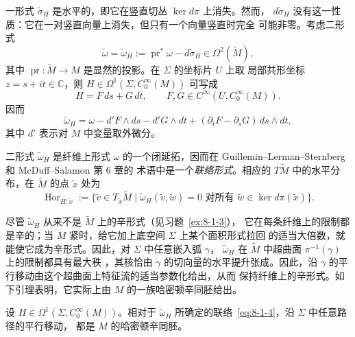 一形式 $\widetilde\sigma_H$ 是水平的，即它在竖直切丛 $\ker d\pi$ 上消失。然而，
$d\widetilde\sigma_H$ 没有这一性质：它在一对竖直向量上消失，但只有一个向量竖直时完全
可能非零。考虑二形式
\begin{equation}\label{eq:8-1-2}
  \widetilde\omega=\widetilde\omega_H
  :=\operatorname{pr}^*\omega-d\widetilde\sigma_H
  \in\Omega^2(\widetilde M),
\end{equation}
其中 $\operatorname{pr}:\widetilde M\to M$ 是显然的投影。在 $\Sigma$ 的坐标片 $U$ 上取
局部共形坐标 $z=s+it\in\mathbb C$，则
$H\in\Omega^1(\Sigma,C_0^\infty(M))$ 可写成
\[
  H=F\,ds+G\,dt,
  \qquad F,G\in C^\infty(U,C_0^\infty(M)).
\]
因而
\begin{equation}\label{eq:8-1-3}
  \widetilde\omega_H
  =\omega-d'F\wedge ds-d'G\wedge dt
   +(\partial_tF-\partial_sG)\,ds\wedge dt,
\end{equation}
其中 $d'$ 表示对 $M$ 中变量取外微分。

二形式 $\widetilde\omega_H$ 是纤维上形式 $\omega$ 的一个闭延拓，因而在
Guillemin--Lerman--Sternberg  和 McDuff--Salamon  第 6 章的
术语中是一个\emph{联络形式}。相应的 $T\widetilde M$ 中的水平分布，在
$\widetilde M$ 的点 $\widetilde x$ 处为
\begin{equation}\label{eq:8-1-4}
  \operatorname{Hor}_{H;\widetilde x}
  :=\bigl\{\widetilde v\in T_{\widetilde x}\widetilde M
  \mid \widetilde\omega_H(\widetilde v,\widetilde w)=0
  \text{ 对所有 }\widetilde w\in\ker d\pi(\widetilde x)\bigr\}.
\end{equation}

尽管 $\widetilde\omega_H$ 从来不是 $\widetilde M$ 上的辛形式（见习题~\ref{ex:8-1-3}），
它在每条纤维上的限制都是辛的；当 $M$ 紧时，给它加上底空间 $\Sigma$ 上某个面积形式拉回
的适当大倍数，就能使它成为辛形式。因此，对 $\Sigma$ 中任意嵌入弧 $\gamma$，
$\widetilde\omega_H$ 在 $\widetilde M$ 中超曲面 $\pi^{-1}(\gamma)$ 上的限制都具有最大秩
，其核恰由
$\gamma$ 的切向量的水平提升张成。因此，沿 $\gamma$ 的平行移动由这个超曲面上特征流的适当参数化给出，从而
保持纤维上的辛形式。如下引理表明，它实际上由 $M$ 的一族哈密顿辛同胚给出。

\begin{lemma}\label{lem:8-1-1}
设 $H\in\Omega^1(\Sigma,C_0^\infty(M))$。相对于
$\widetilde\omega_H$ 所确定的联络~\eqref{eq:8-1-4}，沿 $\Sigma$ 中任意路径的平行移动，
都是 $M$ 的哈密顿辛同胚。
\end{lemma}

